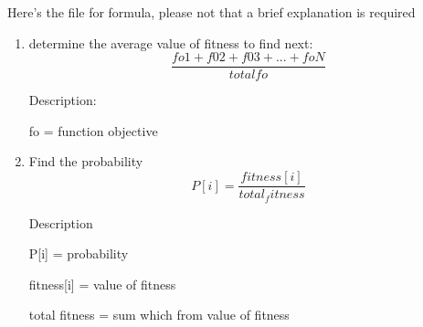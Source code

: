 Here's the file for formula, please not that a brief explanation is required

\begin{enumerate}
    \item determine the average value of fitness to find next:
    \begin{equation}
        \frac{fo1 + f02 + f03 + ... + foN}{total fo}
    \end{equation}
    \par Description:
    \par fo = function objective

    \item Find the probability
    \begin{equation}
        P[i] = \frac{fitness[i]}{total_fitness}
    \end{equation}
    \par Description
    \par P[i] = probability
    \par fitness[i] = value of fitness
    \par total fitness = sum which from value of fitness 
\end{enumerate}